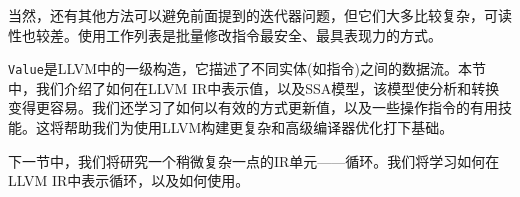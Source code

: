 当然，还有其他方法可以避免前面提到的迭代器问题，但它们大多比较复杂，可读性也较差。使用工作列表是批量修改指令最安全、最具表现力的方式。

\texttt{Value}是LLVM中的一级构造，它描述了不同实体(如指令)之间的数据流。本节中，我们介绍了如何在LLVM IR中表示值，以及SSA模型，该模型使分析和转换变得更容易。我们还学习了如何以有效的方式更新值，以及一些操作指令的有用技能。这将帮助我们为使用LLVM构建更复杂和高级编译器优化打下基础。

下一节中，我们将研究一个稍微复杂一点的IR单元——循环。我们将学习如何在LLVM IR中表示循环，以及如何使用。




















